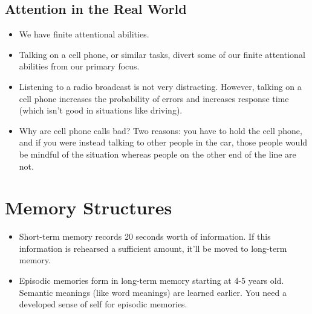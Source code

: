 \documentclass[]{article}
\begin{document}
		\subsection{Attention in the Real World}
			\begin{itemize}
				\item We have finite attentional abilities.
				\item Talking on a cell phone, or similar tasks, divert some of our finite attentional abilities from our primary focus.
				\item Listening to a radio broadcast is not very distracting. However, talking on a cell phone increases the probability of errors and increases response time (which isn't good in situations like driving).
				\item Why are cell phone calls bad? Two reasons: you have to hold the cell phone, and if you were instead talking to other people in the car, those people would be mindful of the situation whereas people on the other end of the line are not.
			\end{itemize}

	\section{Memory Structures}
		\begin{itemize}
			\item Short-term memory records 20 seconds worth of information. If this information is rehearsed a sufficient amount, it'll be moved to long-term memory.
			\item Episodic memories form in long-term memory starting at 4-5 years old. Semantic meanings (like word meanings) are learned earlier. You need a developed sense of self for episodic memories.
		\end{itemize}
\end{document}
